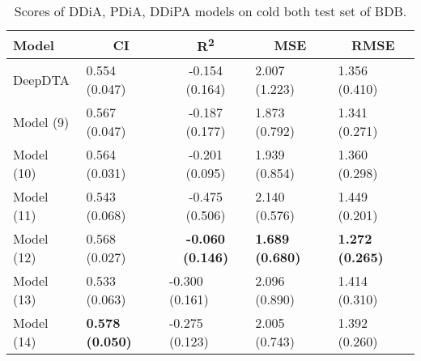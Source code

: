 \begin{table}
\centering
\caption{Scores of DDiA, PDiA, DDiPA models on cold both test set of BDB.}
\vspace{0.25em}
\begin{tabular}{|l|l|c|l|l|} 
\hline
Model & \multicolumn{1}{c|}{CI} & R\textsuperscript{2} & \multicolumn{1}{c|}{MSE} & \multicolumn{1}{c|}{RMSE} \\ 
\hline
DeepDTA & 0.554 (0.047) & -0.154 (0.164) & 2.007 (1.223) & 1.356 (0.410) \\ 
\hline
Model (9) & 0.567 (0.047) & -0.187 (0.177) & 1.873 (0.792) & 1.341 (0.271) \\ 
\hline
Model (10) & 0.564 (0.031) & -0.201 (0.095) & 1.939 (0.854) & 1.360 (0.298) \\ 
\hline
Model (11) & 0.543 (0.068) & -0.475 (0.506) & 2.140 (0.576) & 1.449 (0.201) \\ 
\hline
Model (12) & 0.568 (0.027) & \textbf{-0.060 (0.146)} & \textbf{1.689 (0.680)} & \textbf{1.272 (0.265)} \\ 
\hline
Model (13) & 0.533 (0.063) & \multicolumn{1}{l|}{-0.300 (0.161)} & 2.096 (0.890) & 1.414 (0.310) \\ 
\hline
Model (14) & \textbf{0.578 (0.050)} & \multicolumn{1}{l|}{-0.275 (0.123)} & 2.005 (0.743) & 1.392 (0.260) \\
\hline
\end{tabular}
\label{tab:disease_cold_both}
\end{table}